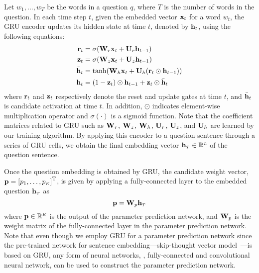 \documentclass[10pt,twocolumn,letterpaper]{article}
\begin{document}
Let $w_{1} ,...,w_{\scriptscriptstyle T}$ be the words in a question $q$, where $T$ is the number of words in the question.
In each time step $t$, given the embedded vector ${\bf{x}}_t$ for a word $w_t$, the GRU encoder updates its hidden state at time $t$, denoted by ${\bf h}_t$, using the following equations:
\begin{align}
{\bf{r}}_{t} &= \sigma({\bf{W}}_r{\bf{x}}_{t}+{\bf U}_r{\bf{h}}_{t-1}) \\
{\bf{z}}_{t} &= \sigma({\bf{W}}_z{\bf{x}}_{t}+{\bf U}_z{\bf{h}}_{t-1}) \\
\bar{{\bf{h}}}_{t} &= \tanh({\bf{W}}_h{\bf{x}}_{t} + {\bf U}_h({\bf{r}}_{t}\odot{\bf{h}}_{t-1})) \\
{\bf{h}}_{t} &= (1-{\bf{z}}_{t})\odot{\bf{h}}_{t-1}+{\bf{z}}_t\odot\bar{{\bf{h}}}_{t} 
\end{align}
where ${\bf{r}}_{t}$ and ${\bf{z}}_{t}$ respectively denote the reset and update gates at time ${t}$, and $\bar{{\bf{h}}}_{t}$ is candidate activation at time $t$.
In addition, $\odot$ indicates element-wise multiplication operator and $\sigma(\cdot)$ is a sigmoid function.
Note that the coefficient matrices related to GRU such as ${\bf{W}}_r$, ${\bf{W}}_z$, ${\bf{W}}_h$, ${\bf{U}}_r$, ${\bf{U}}_z$, and ${\bf{U}}_h$ are learned by our training algorithm.
By applying this encoder to a question sentence through a series of GRU cells, we obtain the final embedding vector ${\bf{h}}_{\scriptscriptstyle T}\in\mathbb{R}^{\scriptscriptstyle L}$ of the question sentence.




Once the question embedding is obtained by GRU, the candidate weight vector, ${\bf{p}}=\left[p_{1},\dots,p_{\scriptscriptstyle K}\right]^{\rm T}$, is given by applying a fully-connected layer to the embedded question ${\bf{h}}_{\scriptscriptstyle T}$ as
\begin{equation}
{\bf{p}} = {\bf{W}}_{p}{\bf{h}}_{\scriptscriptstyle T}
\end{equation}
where ${\bf{p}} \in \mathbb{R}^{\scriptscriptstyle K}$ is the output of the parameter prediction network, and ${\bf{W}}_{p}$ is the weight matrix of the fully-connected layer in the parameter prediction network.
Note that even though we employ GRU for a parameter prediction network since the pre-trained network for sentence embedding---skip-thought vector model~\cite{Skipthought}---is based on GRU, any form of neural networks, \eg, fully-connected and convolutional neural network, can be used to construct the parameter prediction network. 
\end{document}
